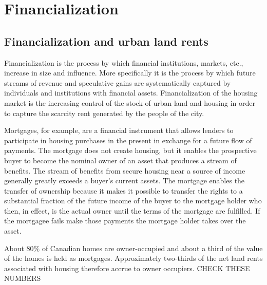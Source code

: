 \chapter{Financialization}


\section{Financialization and urban land rents}

Financialization is the process by which financial institutions, markets, etc., increase in size and influence. More specifically it is the process by which future streams of revenue and speculative gains are systematically captured by individuals and institutions with financial assets. Financialization of the housing market is the increasing control of the stock of urban land and housing in order to capture the scarcity rent generated by the people of the city.  

Mortgages, for example, are a financial instrument that allows lenders to  participate in housing purchases in the present in exchange for a future flow of payments.  The mortgage does not create housing, but it enables the prospective buyer to become the nominal owner of an asset that produces a stream of benefits. The stream of benefits from secure housing near a source of income generally greatly exceeds a buyer's current assets. The mortgage enables the  transfer of ownership because it makes it possible to transfer the rights to a substantial fraction of the future income of the buyer to the mortgage holder who then, in effect, is the actual owner until the terms of the mortgage are fulfilled.  If the mortgagee fails make those payments the mortgage holder  takes over the asset. 

About 80\% of Canadian homes are owner-occupied and about a third of the  value of the homes is held as mortgages. Approximately two-thirds of the net land rents associated with housing therefore accrue to owner occupiers. {\color {red}CHECK THESE NUMBERS } 


\begin{center}
\end{center}

